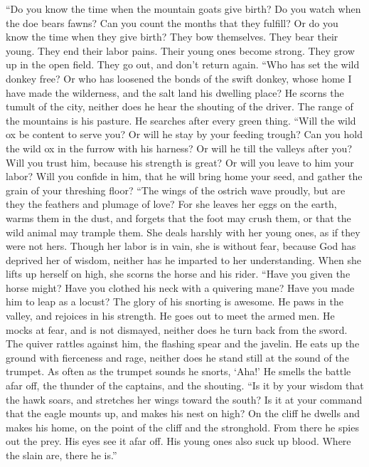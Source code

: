  ``Do you know the time when the mountain goats give
birth? Do you watch when the doe bears fawns?  Can you
count the months that they fulfill? Or do you know the time when they
give birth?  They bow themselves. They bear their young.
They end their labor pains.  Their young ones become
strong. They grow up in the open field. They go out, and don't return
again.  ``Who has set the wild donkey free? Or who has
loosened the bonds of the swift donkey,  whose home I have
made the wilderness, and the salt land his dwelling place?
 He scorns the tumult of the city, neither does he hear
the shouting of the driver.  The range of the mountains is
his pasture. He searches after every green thing.  ``Will
the wild ox be content to serve you? Or will he stay by your feeding
trough?  Can you hold the wild ox in the furrow with his
harness? Or will he till the valleys after you?  Will you
trust him, because his strength is great? Or will you leave to him your
labor?  Will you confide in him, that he will bring home
your seed, and gather the grain of your threshing floor? 
``The wings of the ostrich wave proudly, but are they the feathers and
plumage of love?  For she leaves her eggs on the earth,
warms them in the dust,  and forgets that the foot may
crush them, or that the wild animal may trample them. 
She deals harshly with her young ones, as if they were not hers. Though
her labor is in vain, she is without fear,  because God
has deprived her of wisdom, neither has he imparted to her
understanding.  When she lifts up herself on high, she
scorns the horse and his rider.  ``Have you given the
horse might? Have you clothed his neck with a quivering mane?
 Have you made him to leap as a locust? The glory of his
snorting is awesome.  He paws in the valley, and rejoices
in his strength. He goes out to meet the armed men.  He
mocks at fear, and is not dismayed, neither does he turn back from the
sword.  The quiver rattles against him, the flashing
spear and the javelin.  He eats up the ground with
fierceness and rage, neither does he stand still at the sound of the
trumpet.  As often as the trumpet sounds he snorts,
`Aha!' He smells the battle afar off, the thunder of the captains, and
the shouting.  ``Is it by your wisdom that the hawk
soars, and stretches her wings toward the south?  Is it
at your command that the eagle mounts up, and makes his nest on high?
 On the cliff he dwells and makes his home, on the point
of the cliff and the stronghold.  From there he spies out
the prey. His eyes see it afar off.  His young ones also
suck up blood. Where the slain are, there he is.''

